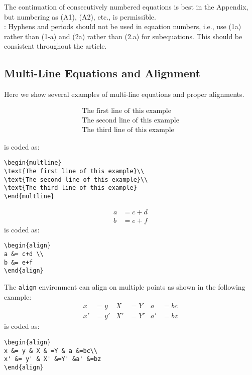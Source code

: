 \documentclass[lettersize,journal]{IEEEtran}
\begin{document}
     The continuation of consecutively numbered equations is best in the Appendix, but numbering
    as (A1), (A2), etc., is permissible.\\

    : Hyphens and periods should not be used in equation numbers, i.e., use (1a) rather than
    (1-a) and (2a) rather than (2.a) for subequations. This should be consistent throughout the article.

    \subsection{Multi-Line Equations and Alignment}
    Here we show several examples of multi-line equations and proper alignments.

    \begin{multline}
        \text{The first line of this example}\\
        \text{The second line of this example}\\
        \text{The third line of this example}
    \end{multline}

    \noindent is coded as:
    \begin{verbatim}
\begin{multline}
\text{The first line of this example}\\
\text{The second line of this example}\\
\text{The third line of this example}
\end{multline}
    \end{verbatim}

    \begin{align}
        a &= c+d \\
        b &= e+f
    \end{align}
    \noindent is coded as:
    \begin{verbatim}
\begin{align}
a &= c+d \\
b &= e+f
\end{align}
    \end{verbatim}

    The {\tt{align}} environment can align on multiple  points as shown in the following example:
    \begin{align}
        x &= y & X & =Y & a &=bc\\
        x' &= y' & X' &=Y' &a' &=bz
    \end{align}
    \noindent is coded as:
    \begin{verbatim}
\begin{align}
x &= y & X & =Y & a &=bc\\
x' &= y' & X' &=Y' &a' &=bz
\end{align}
    \end{verbatim}
\end{document}
